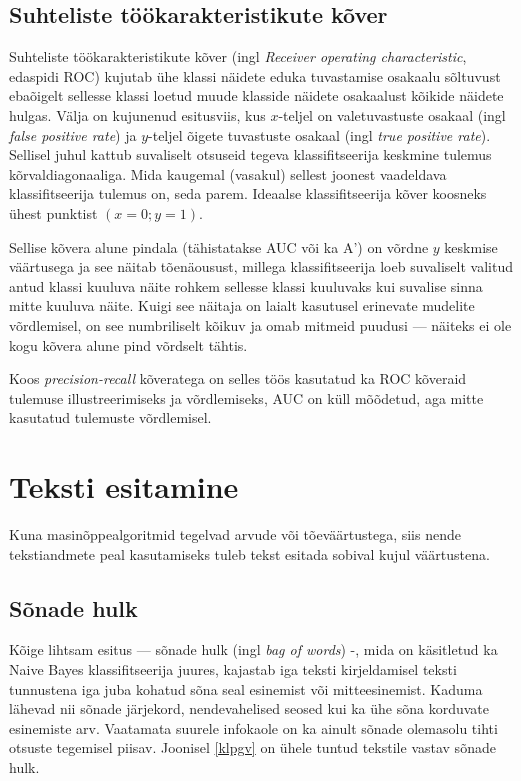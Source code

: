 \documentclass[]{trkuur}
\let\eng\emph
\begin{document}
\subsection{Suhteliste töökarakteristikute kõver}
Suhteliste töökarakteristikute kõver (ingl \eng{Receiver operating characteristic}, edaspidi ROC)
kujutab ühe klassi näidete eduka tuvastamise osakaalu sõltuvust
ebaõigelt sellesse klassi loetud muude klasside näidete osakaalust kõikide
näidete hulgas. Välja on kujunenud esitusviis, kus \(x\)-teljel on
valetuvastuste osakaal (ingl \eng{false positive rate}) ja \(y\)-teljel õigete tuvastuste osakaal (ingl \eng{true positive rate}). Sellisel juhul
kattub suvaliselt otsuseid tegeva klassifitseerija keskmine tulemus
kõrvaldiagonaaliga. Mida kaugemal (vasakul) sellest joonest vaadeldava
klassifitseerija tulemus on, seda parem. Ideaalse klassifitseerija kõver
koosneks ühest punktist \((x=0;y=1)\).
\autocite{wiki-receiver-operating-characteristic}

Sellise kõvera alune pindala (tähistatakse AUC või ka A') on võrdne \( y \)
keskmise väärtusega ja see näitab tõenäousust, millega klassifitseerija loeb
suvaliselt valitud antud klassi kuuluva näite rohkem sellesse klassi kuuluvaks
kui suvalise sinna mitte kuuluva näite. Kuigi see näitaja on laialt kasutusel
erinevate mudelite võrdlemisel, on see numbriliselt kõikuv ja omab mitmeid
puudusi --- näiteks ei ole kogu kõvera alune pind võrdselt tähtis.
\autocite{wiki-receiver-operating-characteristic-area-under-curve}

Koos \eng{precision-recall} kõveratega on selles töös kasutatud ka ROC 
kõveraid tulemuse illustreerimiseks ja võrdlemiseks, AUC on küll mõõdetud, aga
mitte kasutatud tulemuste võrdlemisel.

\section{Teksti esitamine}
Kuna masinõppealgoritmid tegelvad arvude või tõeväärtustega, siis nende
tekstiandmete peal kasutamiseks tuleb tekst esitada sobival kujul väärtustena.
\subsection{Sõnade hulk}
Kõige lihtsam esitus --- sõnade hulk (ingl \eng{bag of words}) -, mida on käsitletud
ka Naive Bayes klassifitseerija juures,
kajastab iga teksti kirjeldamisel teksti tunnustena iga juba kohatud sõna seal
esinemist või mitteesinemist.
Kaduma lähevad nii sõnade järjekord, nendevahelised seosed kui ka ühe
sõna korduvate esinemiste arv. Vaatamata suurele infokaole on ka ainult sõnade
olemasolu tihti otsuste tegemisel piisav. Joonisel \ref{klpgv} on ühele tuntud
tekstile vastav sõnade hulk.
\end{document}
